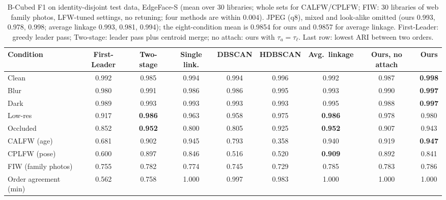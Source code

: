 \documentclass[conference]{IEEEtran}
\begin{document}
\begin{table}[t]
\caption{B-Cubed F1 on identity-disjoint test data, EdgeFace-S (mean over 30 libraries; whole sets for CALFW/CPLFW; FIW: 30 libraries of web family photos,
LFW-tuned settings, no retuning; four methods are within 0.004). JPEG (q8), mixed and look-alike omitted (ours 0.993, 0.978, 0.998; average linkage 0.993, 0.981, 0.994); the eight-condition mean is 0.9854 for ours and 0.9857 for average linkage. First-Leader: greedy leader pass; Two-stage: leader pass plus centroid merge; no attach: ours with
$\tau_a=\tau_\ell$. Last row: lowest ARI between two orders.}
\label{tab:acc}
\centering\small
\setlength{\tabcolsep}{5pt}
\begin{tabular}{lcccccccc}
\toprule
Condition & First-Leader & Two-stage & Single link. & DBSCAN & HDBSCAN & Avg.\ linkage & Ours, no attach & \textbf{Ours} \\
\midrule
Clean      & 0.992 & 0.985 & 0.994 & 0.994 & 0.996 & 0.992 & 0.987 & \textbf{0.998} \\
Blur       & 0.980 & 0.991 & 0.986 & 0.986 & 0.995 & 0.993 & 0.990 & \textbf{0.997} \\
Dark       & 0.989 & 0.993 & 0.993 & 0.993 & 0.993 & 0.995 & 0.988 & \textbf{0.997} \\
Low-res    & 0.917 & \textbf{0.986} & 0.963 & 0.958 & 0.975 & \textbf{0.986} & 0.978 & 0.980 \\
Occluded   & 0.852 & \textbf{0.952} & 0.800 & 0.805 & 0.925 & \textbf{0.952} & 0.907 & 0.943 \\
CALFW (age)  & 0.681 & 0.902 & 0.945 & 0.793 & 0.358 & 0.940 & 0.919 & \textbf{0.947} \\
CPLFW (pose) & 0.600 & 0.897 & 0.846 & 0.516 & 0.520 & \textbf{0.909} & 0.892 & 0.841 \\
FIW (family photos) & 0.755 & 0.782 & 0.774 & 0.745 & 0.729 & 0.785 & 0.783 & 0.786 \\
\midrule
Order agreement (min) & 0.562 & 0.758 & 1.000 & 0.997 & 0.983 & 1.000 & 1.000 & 1.000 \\
\bottomrule
\end{tabular}
\end{table}
\end{document}
